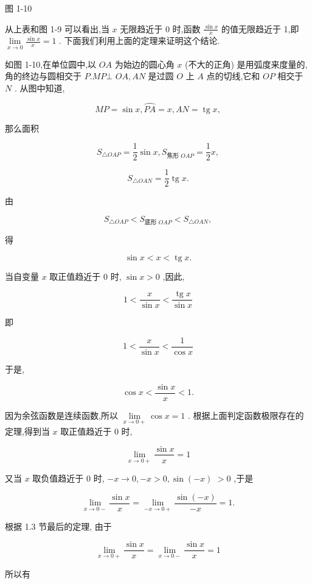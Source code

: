 \documentclass[10pt]{article}
\begin{document}
图 1-10

从上表和图 1-9 可以看出,当 \(x\) 无限趋近于 0 时,函数 \(\frac{\sin x}{x}\) 的值无限趋近于 1,即 \(\mathop{\lim }\limits_{{x \rightarrow 0}}\frac{\sin x}{x} = 1\) . 下面我们利用上面的定理来证明这个结论.

如图 1-10,在单位圆中,以 \({OA}\) 为始边的圆心角 \(x\) (不大的正角) 是用弧度来度量的,角的终边与圆相交于 \(P.{MP} \bot\) \({OA},{AN}\) 是过圆 \(O\) 上 \(A\) 点的切线,它和 \({OP}\) 相交于 \(N\) . 从图中知道,

\[
{MP} = \sin x,\overset{⏜}{PA} = x,{AN} = \operatorname{tg}x,
\]

那么面积

\[
{S}_{\bigtriangleup {OAP}} = \frac{1}{2}\sin x,{S}_{\text{焦形 }{OAP}} = \frac{1}{2}x,
\]

\[
{S}_{\bigtriangleup {OAN}} = \frac{1}{2}\operatorname{tg}x.
\]

由

\[
{S}_{\bigtriangleup {OAP}} < {S}_{\text{底形 }{OAP}} < {S}_{\bigtriangleup {OAN}},
\]

得

\[
\sin x < x < \operatorname{tg}x\text{.}
\]

当自变量 \(x\) 取正值趋近于 0 时, \(\sin x > 0\) ,因此,

\[
1 < \frac{x}{\sin x} < \frac{\operatorname{tg}x}{\sin x}
\]

即

\[
1 < \frac{x}{\sin x} < \frac{1}{\cos x}
\]

于是,

\[
\cos x < \frac{\sin x}{x} < 1\text{.}
\]

因为余弦函数是连续函数,所以 \(\mathop{\lim }\limits_{{x \rightarrow 0 + }}\cos x = 1\) . 根据上面判定函数极限存在的定理,得到当 \(x\) 取正值趋近于 0 时,

\[
\mathop{\lim }\limits_{{x \rightarrow 0 + }}\frac{\sin x}{x} = 1
\]

又当 \(x\) 取负值趋近于 0 时, \(- x \rightarrow 0, - x > 0,\sin \left( {-x}\right)\) \(> 0\) ,于是

\[
\mathop{\lim }\limits_{{x \rightarrow 0 - }}\frac{\sin x}{x} = \mathop{\lim }\limits_{{-x \rightarrow 0 + }}\frac{\sin \left( {-x}\right) }{-x} = 1.
\]

根据 1.3 节最后的定理, 由于

\[
\mathop{\lim }\limits_{{x \rightarrow 0 + }}\frac{\sin x}{x} = \mathop{\lim }\limits_{{x \rightarrow 0 - }}\frac{\sin x}{x} = 1
\]

所以有
\end{document}
